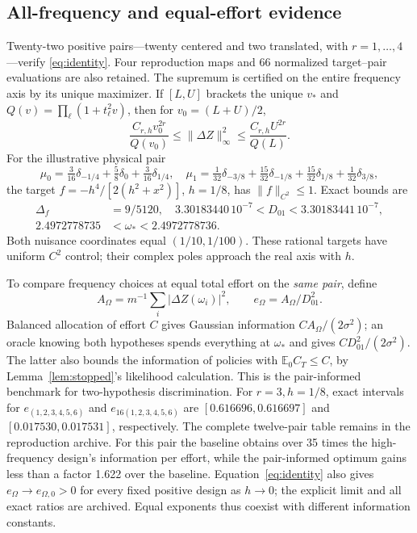 \documentclass[10pt]{amsart}
\theoremstyle{definition}
\theoremstyle{remark}
\newcommand{\E}{\mathbb E}
\begin{document}
\subsection{All-frequency and equal-effort evidence}
Twenty-two positive pairs---twenty centered and two translated, with $r=1,\ldots,4$---verify \eqref{eq:identity}. Four reproduction maps and 66 normalized target--pair evaluations are also retained. The supremum is certified on the entire frequency axis by its unique maximizer. If $[L,U]$ brackets the unique $v_*$ and $Q(v)=\prod_\ell(1+t_\ell^2v)$, then for $v_0=(L+U)/2$,
\[
 \frac{C_{r,h}v_0^{2r}}{Q(v_0)}\le\|\Delta Z\|_\infty^2
 \le\frac{C_{r,h}U^{2r}}{Q(L)}.
\]
For the illustrative physical pair
\[
 \mu_0=\tfrac3{16}\delta_{-1/4}+\tfrac58\delta_0+\tfrac3{16}\delta_{1/4},\quad
 \mu_1=\tfrac1{32}\delta_{-3/8}+\tfrac{15}{32}\delta_{-1/8}
        +\tfrac{15}{32}\delta_{1/8}+\tfrac1{32}\delta_{3/8},
\]
the target $f=-h^4/[2(h^2+x^2)]$, $h=1/8$, has $\|f\|_{C^2}\le1$. Exact bounds are
\begin{align}\label{eq:example}
 \Delta_f&=9/5120,\quad 3.30183440\,10^{-7}<D_{01}<3.30183441\,10^{-7},\nonumber\\
 2.4972778735&<\omega_*<2.4972778736.
\end{align}
Both nuisance coordinates equal $(1/10,1/100)$. These rational targets have uniform $C^2$ control; their complex poles approach the real axis with $h$.

To compare frequency choices at equal total effort on the \emph{same pair}, define
\begin{equation}\label{eq:efficiency}
 A_\Omega=m^{-1}\sum_i|\Delta Z(\omega_i)|^2,\qquad
 e_\Omega=A_\Omega/D_{01}^2.
\end{equation}
Balanced allocation of effort $C$ gives Gaussian information $CA_\Omega/(2\sigma^2)$; an oracle knowing both hypotheses spends everything at $\omega_*$ and gives $CD_{01}^2/(2\sigma^2)$. The latter also bounds the information of policies with $\E_0C_T\le C$, by Lemma~\ref{lem:stopped}'s likelihood calculation. This is the pair-informed benchmark for two-hypothesis discrimination.
For $r=3,h=1/8$, exact intervals for $e_{(1,2,3,4,5,6)}$ and $e_{16(1,2,3,4,5,6)}$ are $[0.616696,0.616697]$ and $[0.017530,0.017531]$, respectively. The complete twelve-pair table remains in the reproduction archive.
For this pair the baseline obtains over 35 times the high-frequency design's information per effort, while the pair-informed optimum gains less than a factor 1.622 over the baseline. Equation~\eqref{eq:identity} also gives $e_\Omega\to e_{\Omega,0}>0$ for every fixed positive design as $h\to0$; the explicit limit and all exact ratios are archived. Equal exponents thus coexist with different information constants.
\end{document}
